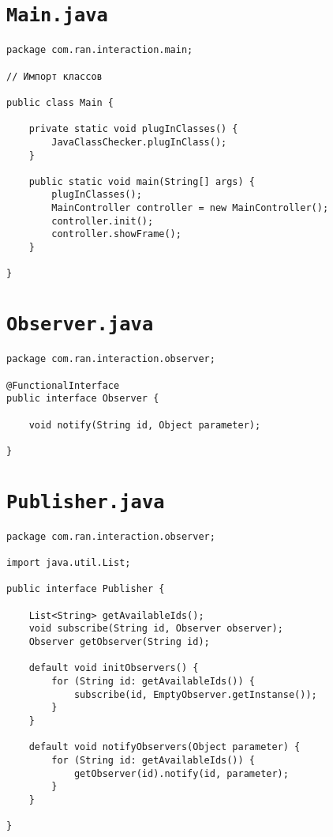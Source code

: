 \section*{\texttt{Main.java}}
\begin{verbatim}
package com.ran.interaction.main;

// Импорт классов

public class Main {

    private static void plugInClasses() {
        JavaClassChecker.plugInClass();
    }

    public static void main(String[] args) {
        plugInClasses();
        MainController controller = new MainController();
        controller.init();
        controller.showFrame();
    }

}
\end{verbatim}

\section*{\texttt{Observer.java}}
\begin{verbatim}
package com.ran.interaction.observer;

@FunctionalInterface
public interface Observer {

    void notify(String id, Object parameter);
    
}
\end{verbatim}

\section*{\texttt{Publisher.java}}
\begin{verbatim}
package com.ran.interaction.observer;

import java.util.List;

public interface Publisher {

    List<String> getAvailableIds();
    void subscribe(String id, Observer observer);
    Observer getObserver(String id);
    
    default void initObservers() {
        for (String id: getAvailableIds()) {
            subscribe(id, EmptyObserver.getInstanse());
        }
    }
    
    default void notifyObservers(Object parameter) {
        for (String id: getAvailableIds()) {
            getObserver(id).notify(id, parameter);
        }
    }
    
}
\end{verbatim}

